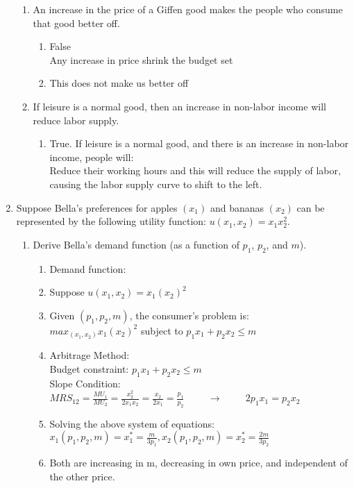 \documentclass[11pt]{article}
\begin{document}
\begin{enumerate}
\begin{enumerate}
    \item An increase in the price of a Giffen good makes the people who consume that good better off.
    \begin{enumerate}
        \item False
        \\ Any increase in price shrink the budget set
        \item This does not make us better off
    \end{enumerate}

    \item If leisure is a normal good, then an increase in non-labor income will reduce labor supply.
    \begin{enumerate}
        \item True. If leisure is a normal good, and there is an increase in non-labor income, people will:\\ Reduce their working hours and this will reduce the supply of labor, causing the labor supply curve to shift to the left.
    \end{enumerate}

\end{enumerate}

\pagebreak
\item Suppose Bella's preferences for apples $(x_{1})$ and bananas $(x_{2})$ can be represented by the following utility function: $u(x_{1},x_{2})=x_{1}x_{2}^{2}$.
    \begin{enumerate}
        \item Derive Bella's demand function (as a function of $p_{1}$, $p_{2}$, and $m$).
        \begin{enumerate}
            \item Demand function:
            \item Suppose $u(x_1, x_2) = x_1(x_2)^2$
            \item Given $(p_1, p_2, m)$, the consumer's problem is:\\
            $max_{(x_1, x_2)} x_1(x_2)^2$ subject to $p_1x_1 + p_2x_2 \leq m$
            \item Arbitrage Method:\\
            Budget constraint: $p_1x_1 + p_2x_2 \leq m$\\
            Slope Condition: $MRS_{12} = \frac{MU_1}{MU_2} = \frac{x^2_2}{2x_1x_2} = \frac{x_2}{2x_1} = \frac{p_1}{p_2} \hspace{1cm} \rightarrow \hspace{1cm} 2p_1x_1 = p_2x_2$
            \item Solving the above system of equations:\\
            $x_1(p_1, p_2, m)=x_1^* = \frac{m}{3p_1}, x_2(p_1, p_2, m) = x_2^* = \frac{2m}{3p_2}$
            \item Both are increasing in m, decreasing in own price, and independent of the other price.
        \end{enumerate}


\end{enumerate}
\end{enumerate}
\end{document}
